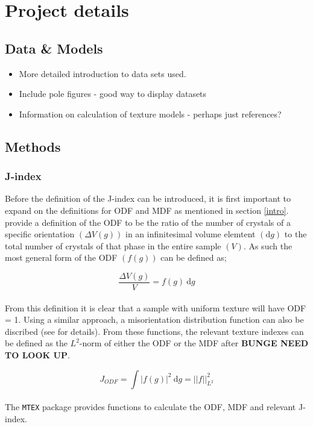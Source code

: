 \documentclass[]{article}
\numberwithin{equation}{section}
\begin{document}
\section{Project details}
\subsection{Data \& Models}

\begin{itemize}
  \item More detailed introduction to data sets used.
  \item Include pole figures - good way to display datasets
  \item Information on calculation of texture models - perhaps just references?
\end{itemize}

\subsection{Methods} \label{methods} 

\subsubsection{J-index}
Before the definition of the J-index can be introduced, it is first important to expand on the definitions for ODF and MDF as 
mentioned in section \ref{intro}. \cite{Mainprice} provide a definition of the ODF to be the ratio of the number of crystals
of a specific orientation $(\Delta{V(g)})$ in an infinitesimal volume elemtent $(\mathrm{d}g)$ to the total number of crystals of that phase 
in the entire sample $(V)$. As such the most general form of the ODF $(f(g))$ can be defined as;

\begin{equation}
\frac{\Delta{V(g)}}{V} = f(g)\ \mathrm{d}g
\end{equation}
\\
From this definition it is clear that a sample with uniform texture will have ODF = 1. Using a similar approach, a misorientation
distribution function can also be discribed (see \cite{Mainprice} for details). From these functions, the relevant texture indexes 
can be defined as the $L^2$-norm of either the ODF or the MDF after \textbf{BUNGE NEED TO LOOK UP}.

\begin{equation}
 J_{ODF} = \int |f(g)|^2\ \mathrm{d}g = ||f||^2_{L^2}
\end{equation}
\\
The \texttt{MTEX} package provides functions to calculate the ODF, MDF and relevant J-index.
\end{document}
